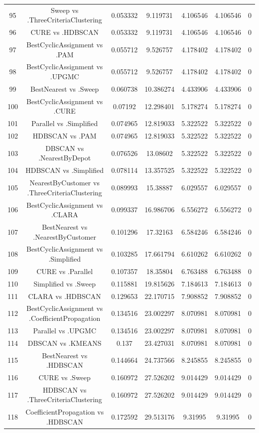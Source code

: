 \documentclass[a4paper,10pt]{article}
\begin{document}
\begin{landscape}
\begin{table}[!htp]
\begin{tabular}{ccccccc}
95&Sweep vs .ThreeCriteriaClustering&0.053332&9.119731&4.106546&4.106546&0\\
96&CURE vs .HDBSCAN&0.053332&9.119731&4.106546&4.106546&0\\
97&BestCyclicAssignment vs .PAM&0.055712&9.526757&4.178402&4.178402&0\\
98&BestCyclicAssignment vs .UPGMC&0.055712&9.526757&4.178402&4.178402&0\\
99&BestNearest vs .Sweep&0.060738&10.386274&4.433906&4.433906&0\\
100&BestCyclicAssignment vs .CURE&0.07192&12.298401&5.178274&5.178274&0\\
101&Parallel vs .Simplified&0.074965&12.819033&5.322522&5.322522&0\\
102&HDBSCAN vs .PAM&0.074965&12.819033&5.322522&5.322522&0\\
103&DBSCAN vs .NearestByDepot&0.076526&13.08602&5.322522&5.322522&0\\
104&HDBSCAN vs .Simplified&0.078114&13.357525&5.322522&5.322522&0\\
105&NearestByCustomer vs .ThreeCriteriaClustering&0.089993&15.38887&6.029557&6.029557&0\\
106&BestCyclicAssignment vs .CLARA&0.099337&16.986706&6.556272&6.556272&0\\
107&BestNearest vs .NearestByCustomer&0.101296&17.32163&6.584246&6.584246&0\\
108&BestCyclicAssignment vs .Simplified&0.103285&17.661794&6.610262&6.610262&0\\
109&CURE vs .Parallel&0.107357&18.35804&6.763488&6.763488&0\\
110&Simplified vs .Sweep&0.115881&19.815626&7.184613&7.184613&0\\
111&CLARA vs .HDBSCAN&0.129653&22.170715&7.908852&7.908852&0\\
112&BestCyclicAssignment vs .CoefficientPropagation&0.134516&23.002297&8.070981&8.070981&0\\
113&Parallel vs .UPGMC&0.134516&23.002297&8.070981&8.070981&0\\
114&DBSCAN vs .KMEANS&0.137&23.427031&8.070981&8.070981&0\\
115&BestNearest vs .HDBSCAN&0.144664&24.737566&8.245855&8.245855&0\\
116&CURE vs .Sweep&0.160972&27.526202&9.014429&9.014429&0\\
117&HDBSCAN vs .ThreeCriteriaClustering&0.160972&27.526202&9.014429&9.014429&0\\
118&CoefficientPropagation vs .HDBSCAN&0.172592&29.513176&9.31995&9.31995&0\\

\end{tabular}
\end{table}
\end{landscape}
\end{document}

